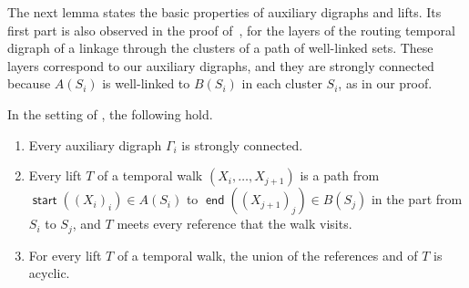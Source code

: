 \documentclass[fontsize=12pt,leading=14pt]{fullpaper}
\DeclareMathOperator{\st}{\mathsf{start}}
\DeclareMathOperator{\en}{\mathsf{end}}
\begin{document}
The next lemma states the basic properties of auxiliary digraphs and lifts.
Its first part is also observed in the proof of~\cite[Theorem~8.6]{HKMM26a}, for the layers of the routing temporal digraph of a linkage through the clusters of a path of well-linked sets.
These layers correspond to our auxiliary digraphs, and they are strongly connected because $A(S_i)$ is well-linked to $B(S_i)$ in each cluster $S_i$, as in our proof.

\begin{lemma}\label{lem:s3-lift}
  In the setting of , the following hold.
  \begin{enumerate}[label=\textnormal{(\roman*)}]
    \item\label{item:s3-lift-strong} Every auxiliary digraph $\Gamma_i$ is strongly connected.
    \item\label{item:s3-lift-path} Every lift $T$ of a temporal walk $(X_i,\dots,X_{j+1})$ is a path from $\st((X_i)_i)\in A(S_i)$ to $\en((X_{j+1})_j)\in B(S_j)$ in the part from $S_i$ to $S_j$, and $T$ meets every reference that the walk visits.
    \item\label{item:s3-lift-acyclic} For every lift $T$ of a temporal walk, the union of the references and of $T$ is acyclic.
  \end{enumerate}
\end{lemma}
\end{document}
